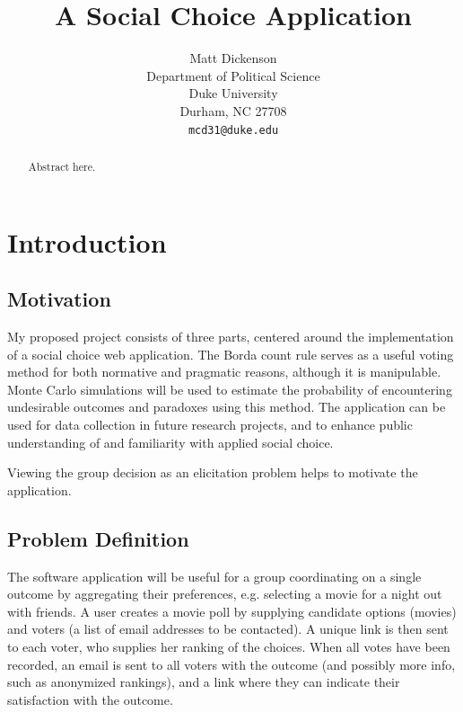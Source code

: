 \documentclass[12pt,letterpaper]{article} %
\title{A Social Choice Application}
\author{
Matt Dickenson\\
Department of Political Science\\
Duke University\\
Durham, NC 27708 \\
\texttt{mcd31@duke.edu}
}
\begin{document}
\begin{titlepage}

\clearpage
\maketitle
\thispagestyle{empty}

\begin{abstract}
Abstract here.
\end{abstract}

\end{titlepage}



\newpage

\section{Introduction}

\subsection{Motivation}


My proposed project consists of three parts, centered around the implementation of a social choice web application. The Borda count rule serves as a useful voting method for both normative and pragmatic reasons, although it is manipulable. Monte Carlo simulations will be used to estimate the probability of encountering undesirable outcomes and paradoxes using this method. The application can be used for data collection in future research projects, and to enhance public understanding of and familiarity with applied social choice.

Viewing the group decision as an elicitation problem helps to motivate the application.


\subsection{Problem Definition} 


The software application will be useful for a group coordinating on a single outcome by aggregating their preferences, e.g. selecting a movie for a night out with friends. A user creates a movie poll by supplying candidate options (movies) and voters (a list of email addresses to be contacted). A unique link is then sent to each voter, who supplies her ranking of the choices. When all votes have been recorded, an email is sent to all voters with the outcome (and possibly more info, such as anonymized rankings), and a link where they can indicate their satisfaction with the outcome.
\end{document}
